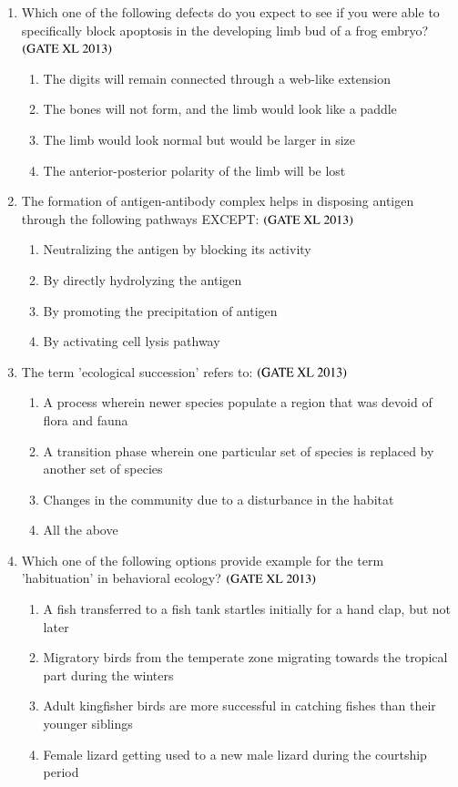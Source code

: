\documentclass[journal]{IEEEtran}
\begin{document}
\begin{enumerate}
\item Which one of the following defects do you expect to see if you were able to specifically block apoptosis in the developing limb bud of a frog embryo? \hfill $\left(\text{GATE XL 2013}\right)$
\begin{enumerate}
    \item The digits will remain connected through a web-like extension
    \item The bones will not form, and the limb would look like a paddle
    \item The limb would look normal but would be larger in size
    \item The anterior-posterior polarity of the limb will be lost
\end{enumerate}

\item The formation of antigen-antibody complex helps in disposing antigen through the following pathways EXCEPT: \hfill $\left(\text{GATE XL 2013}\right)$
\begin{enumerate}
    \item Neutralizing the antigen by blocking its activity
    \item By directly hydrolyzing the antigen
    \item By promoting the precipitation of antigen
    \item By activating cell lysis pathway
\end{enumerate}

\item The term 'ecological succession' refers to: \hfill $\left(\text{GATE XL 2013}\right)$
\begin{enumerate}
    \item A process wherein newer species populate a region that was devoid of flora and fauna
    \item A transition phase wherein one particular set of species is replaced by another set of species
    \item Changes in the community due to a disturbance in the habitat
    \item All the above
\end{enumerate}

\item Which one of the following options provide example for the term 'habituation' in behavioral ecology? \hfill $\left(\text{GATE XL 2013}\right)$
\begin{enumerate}
    \item A fish transferred to a fish tank startles initially for a hand clap, but not later
    \item Migratory birds from the temperate zone migrating towards the tropical part during the winters
    \item Adult kingfisher birds are more successful in catching fishes than their younger siblings
    \item Female lizard getting used to a new male lizard during the courtship period
\end{enumerate}


\end{enumerate}
\end{document}
